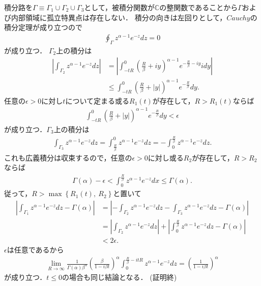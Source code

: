 \documentclass[a4j,papersize,disablejfam,slide,14pt]{jsarticle}
\def\qed{{(証明終)}} %
\def\max#1#2{\operatorname{max} \left\{ #1,\ #2 \right\}} %
\def\exp#1{e^{#1}} %
\begin{document}
\begin{description}
        積分路を$\Gamma \equiv \Gamma_1 \cup \Gamma_2 \cup \Gamma_3$として，被積分関数が$\mathbb{C}$の整関数であることから$\Gamma$および内部領域に孤立特異点は存在しない．
		積分の向きは左回りとして，$Cauchy$の積分定理が成り立つので
		\begin{align}
			\oint_{\Gamma} z^{\alpha-1} e^{-z} dz = 0
		\end{align}
		が成り立つ．
		$\Gamma_2$上の積分は
		\begin{align}
			\left| \int_{\Gamma_2} z^{\alpha-1} \exp{-z} dz \right| 
            &= \left| \int_{-tR}^{0} \left(\frac{R}{\beta}+iy\right)^{\alpha-1} \exp{-\frac{R}{\beta}-iy} i dy \right| \\
			&\leq \int_{-tR}^{0} \left(\frac{R}{\beta}+|y|\right)^{\alpha-1} \exp{-\frac{R}{\beta}} dy.
		\end{align}
		任意の$\epsilon > 0$に対し$t$について定まる或る$R_1(t)$が存在して，$R > R_1(t)$ならば
		\begin{align}
			\int_{-tR}^{0} \left(\frac{R}{\beta}+|y|\right)^{\alpha-1} e^{-\frac{R}{\beta}} dy < \epsilon
		\end{align}
		が成り立つ．$\Gamma_3$上の積分は
		\begin{align}
			\int_{\Gamma_3} z^{\alpha-1} e^{-z} dz = \int_{\frac{R}{\beta}}^{0} z^{\alpha-1} e^{-z} dz = -\int_{0}^{\frac{R}{\beta}} z^{\alpha-1} e^{-z} dz.
		\end{align}
		これも広義積分は収束するので，任意の$\epsilon > 0$に対し或る$R_2$が存在して，$R > R_2$ならば
		\begin{align}
			\Gamma(\alpha)-\epsilon < \int_{0}^{\frac{R}{\beta}} z^{\alpha-1} e^{-z} dx \leq \Gamma(\alpha).
		\end{align}
		従って，$R > \max{R_1(t)}{R_2}$と置いて
		\begin{align}
			\left|\int_{\Gamma_1} z^{\alpha-1} e^{-z} dz -  \Gamma(\alpha)\right|
			&= \left|-\int_{\Gamma_2} z^{\alpha-1} e^{-z} dz
		    	   -\int_{\Gamma_3} z^{\alpha-1} e^{-z} dz - \Gamma(\alpha)\right| \\
            &= \left|\int_{\Gamma_2} z^{\alpha-1} e^{-z} dz \right| + \left| \int_{0}^{\frac{R}{\beta}} z^{\alpha-1} e^{-z} dz - \Gamma(\alpha)\right| \\
            &< 2 \epsilon.
		\end{align}
		$\epsilon$は任意であるから
		\begin{align}
			\lim_{R \to \infty} \frac{1}{\Gamma(\alpha)\beta^\alpha} \left(\frac{\beta}{1-i \beta t}\right)^\alpha \int_{0}^{\frac{R}{\beta}-itR} z^{\alpha-1} e^{-z} dz 
			= \left(\frac{1}{1-i \beta t}\right)^\alpha
		\end{align}
		が成り立つ．$t \leq 0$の場合も同じ結論となる．
        \qed
    \end{description}
\end{document}
